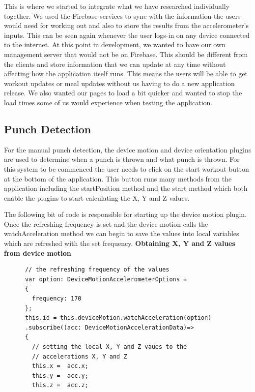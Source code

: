 \documentclass[a4paper,12pt]{report}
\begin{document}
This is where we started to integrate what we have researched individually together. We used the Firebase services to sync with the information the users would need for working out and also to store the results from the accelerometer's inputs. This can be seen again whenever the user logs-in on any device connected to the internet. At this point in development, we wanted to have our own management server that would not be on Firebase. This should be different from the clients and store information that we can update at any time without affecting how the application itself runs. This means the users will be able to get workout updates or meal updates without us having to do a new application release. We also wanted our pages to load a bit quicker and wanted to stop the load times some of us would experience when testing the application.
\newpage
\subsection{Punch Detection}
For the manual punch detection, the device motion and device orientation plugins are used to determine when a punch is thrown and what punch is thrown. 
For this system to be commenced the user needs to click on the start workout button at the bottom of the application.
This button runs many methods from the application including the startPosition method and the start method which both enable the plugins to start calculating the X, Y and Z values.

The following bit of code is responsible for starting up the device motion plugin.
Once the refreshing frequency is set and the device motion calls the watchAcceleration method we can begin to save the values into local variables which are refreshed with the set frequency.
\textbf{Obtaining X, Y and Z values from device motion}
\begin{verbatim} 
      // the refreshing frequency of the values 
      var option: DeviceMotionAccelerometerOptions = 
      {
        frequency: 170
      };
      this.id = this.deviceMotion.watchAcceleration(option)
      .subscribe((acc: DeviceMotionAccelerationData)=>
      {
        // setting the local X, Y and Z vaues to the 
        // accelerations X, Y and Z 
        this.x =  acc.x;
        this.y =  acc.y;
        this.z =  acc.z;   
\end{verbatim}
\end{document}
